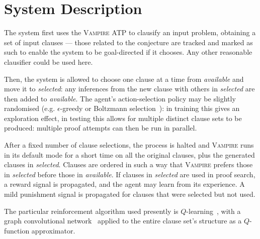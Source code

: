 \documentclass[twocolumn,a4paper,10pt]{article}
\newcommand{\vampire}{\textsc{Vampire}}
\begin{document}
\section{System Description}
The system first uses the \vampire{} ATP to clausify an input problem, obtaining a set of input clauses --- those related to the conjecture are tracked and marked as such to enable the system to be goal-directed if it chooses.
Any other reasonable clausifier could be used here.

Then, the system is allowed to choose one clause at a time from \emph{available} and move it to \emph{selected}: any inferences from the new clause with others in \emph{selected} are then added to \emph{available}.
The agent's action-selection policy may be slightly randomised (e.g. \(\epsilon\)-greedy or Boltzmann selection~\cite{random-action}): in training this gives an exploration effect, in testing this allows for multiple distinct clause sets to be produced: multiple proof attempts can then be run in parallel.

After a fixed number of clause selections, the process is halted and \vampire{} runs in its default mode for a short time on all the original clauses, plus the generated clauses in \emph{selected}.
Clauses are ordered in such a way that \vampire{} prefers those in \emph{selected} before those in \emph{available}.
If clauses in \emph{selected} are used in proof search, a reward signal is propagated, and the agent may learn from its experience.
A mild punishment signal is propagated for clauses that were selected but not used.

The particular reinforcement algorithm used presently is \(Q\)-learning~\cite{q-learning}, with a graph convolutional network~\cite{gcn} applied to the entire clause set's structure as a \(Q\)-function approximator.
\end{document}
